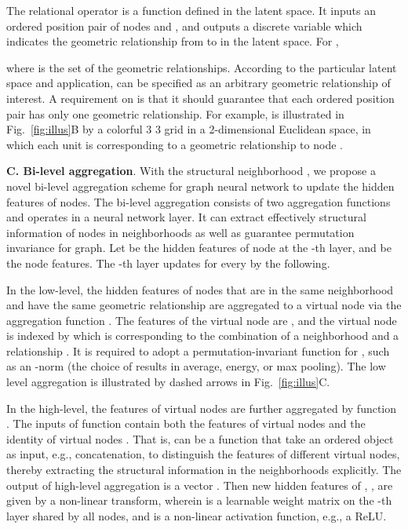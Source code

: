 \documentclass{article} \usepackage{iclr2020_conference,times}
\begin{document}
The relational operator  is a function defined in the latent space.
It inputs an ordered position pair  of nodes  and , and outputs a discrete variable  which indicates the geometric relationship from  to  in the latent space. For ,

where  is the set of the geometric relationships.
According to the particular latent space and application,  can be specified as an arbitrary geometric relationship of interest.
A requirement on  is that it should guarantee that each ordered position pair has only one geometric relationship.
For example,  is illustrated in Fig.~\ref{fig:illus}B by a colorful 3  3 grid in a 2-dimensional Euclidean space, in which each unit is corresponding to a geometric relationship to node .

\textbf{C. Bi-level aggregation}.
With the structural neighborhood , we propose a novel bi-level aggregation scheme for graph neural network to update the hidden features of nodes.
The bi-level aggregation consists of two aggregation functions and operates in a neural network layer.
It can extract effectively structural information of nodes in neighborhoods as well as guarantee permutation invariance for graph.
Let  be the hidden features of node  at the -th layer, and  be the node features.
The -th layer updates  for every  by the following.


In the low-level, the hidden features of nodes that are in the same neighborhood  and have the same geometric relationship  are aggregated to a virtual node via the aggregation function .
The features of the virtual node are , and the virtual node is indexed by  which is corresponding to the combination of a neighborhood  and a relationship . 
It is required to adopt a permutation-invariant function for , such as an -norm (the choice of  results in average, energy, or max pooling).
The low level aggregation is illustrated by dashed arrows in Fig.~\ref{fig:illus}C.


In the high-level, the features of virtual nodes are further aggregated by function .
The inputs of function  contain both the features of virtual nodes  and the identity of virtual nodes .
That is,  can be a function that take an ordered object as input, e.g., concatenation, to distinguish the features of different virtual nodes, thereby extracting the structural information in the neighborhoods explicitly.
The output of high-level aggregation is a vector .
Then new hidden features of , , are given  by a non-linear transform, wherein  is a learnable weight matrix on the -th layer shared by all nodes, and  is a non-linear activation function, e.g., a ReLU.
\end{document}
